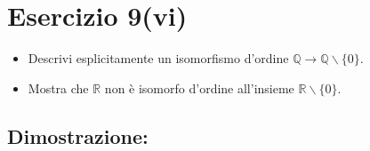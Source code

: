 \documentclass[12pt,a4paper,draft]{article}
\begin{document}
%
%

\section{Esercizio 9(vi)}
\begin{itemize}
\item Descrivi esplicitamente un isomorfismo d'ordine $\mathbb{Q}\rightarrow \mathbb{Q}\backslash\{0\}$.
\item Mostra che $\mathbb{R}$ non è isomorfo d'ordine all'insieme $\mathbb{R}\backslash\{0\}$. 
\end{itemize}

\subsection*{Dimostrazione:}
\end{document}
